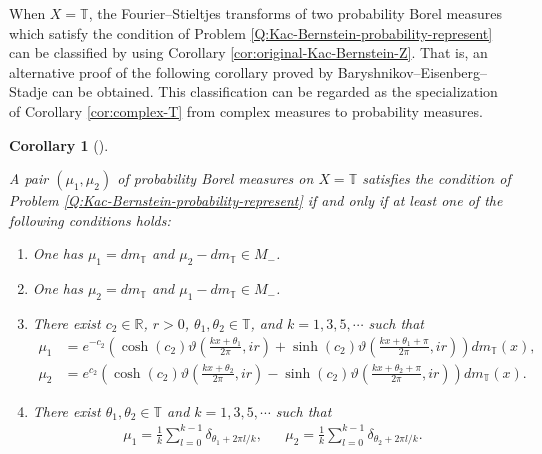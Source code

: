 \documentclass[12pt]{article}
\newtheorem{corollary}[theorem]{Corollary}
\theoremstyle{definition}
\theoremstyle{remark}
\numberwithin{equation}{section}
\numberwithin{figure}{section}
\numberwithin{table}{section}
\begin{document}
When $ X = \mathbb{ T } $, the Fourier--Stieltjes transforms of two probability Borel measures which satisfy the condition of Problem \ref{Q:Kac-Bernstein-probability-represent} can be classified by using Corollary \ref{cor:original-Kac-Bernstein-Z}.
That is, an alternative proof of the following corollary proved by  Baryshnikov--Eisenberg--Stadje can be obtained.
This classification can be regarded as the specialization of Corollary \ref{cor:complex-T} from complex measures to probability measures.

\begin{corollary}[{\cite[Theorem 2]{MR1221915}}]
  \label{cor:Baryshnikov-Eisenberg-Stadje}

A pair $ ( \mu_1 , \mu_2 ) $ of probability Borel measures on $ X = \mathbb{ T } $ satisfies the condition of Problem \ref{Q:Kac-Bernstein-probability-represent} if and only if at least one of the following conditions holds:

\begin{enumerate}
\item \label{item:Baryshnikov-Eisenberg-Stadje-f1-one-point}

One has $ \mu_1 = dm_{ \mathbb{ T } } $ and $ \mu_2 - dm_{ \mathbb{ T } } \in M_- $.

\item \label{item:Baryshnikov-Eisenberg-Stadje-f2-one-point}

One has $ \mu_2 = dm_{ \mathbb{ T } } $ and $ \mu_1 - dm_{ \mathbb{ T } } \in M_- $.

\item \label{item:Baryshnikov-Eisenberg-Stadje-Gauss}

There exist $ c_2 \in \mathbb{ R } $, $ r > 0 $, $ \theta_1 , \theta_2 \in \mathbb{ T } $, and $ k = 1 , 3 , 5 , \cdots $ such that
\begin{align}
\mu_1 & = e^{ - c_2 } \left( \cosh ( c_2 ) \vartheta \left( \frac{ k x + \theta_1 }{ 2 \pi } , i r \right) + \sinh ( c_2 ) \vartheta \left( \frac{ k x + \theta_1 + \pi }{ 2 \pi } , i r \right) \right) dm_{ \mathbb{ T } } ( x ), \\
\mu_2 & = e^{ c_2 } \left( \cosh ( c_2 ) \vartheta \left( \frac{ k x + \theta_2 }{ 2 \pi } , i r \right) - \sinh ( c_2 ) \vartheta \left( \frac{ k x + \theta_2 + \pi }{ 2 \pi } , i r \right) \right) dm_{ \mathbb{ T } } ( x ).
\end{align}

\item \label{item:Baryshnikov-Eisenberg-Stadje-Zk}

There exist $ \theta_1 , \theta_2 \in \mathbb{ T } $ and $ k = 1 , 3 , 5 , \cdots $ such that
\begin{align}
    \mu_1 = \frac{ 1 }{ k } \sum_{ l = 0 }^{ k - 1 } \delta_{ \theta_1 + 2 \pi l / k }, & &
    \mu_2 = \frac{ 1 }{ k } \sum_{ l = 0 }^{ k - 1 } \delta_{ \theta_2 + 2 \pi l / k }.
\end{align}

\end{enumerate}
    
\end{corollary}
\end{document}
